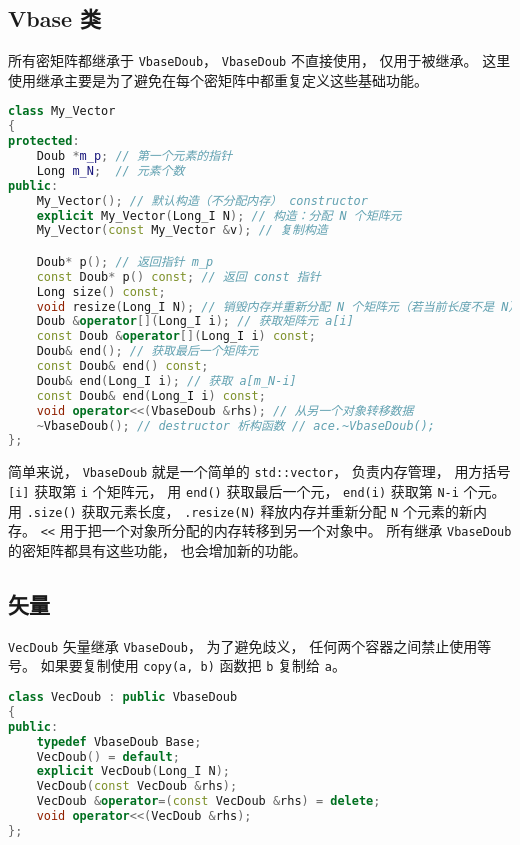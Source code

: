 \subsection{Vbase 类}
所有密矩阵都继承于 \verb|VbaseDoub|， \verb|VbaseDoub| 不直接使用， 仅用于被继承。 这里使用继承主要是为了避免在每个密矩阵中都重复定义这些基础功能。
\begin{lstlisting}[language=cpp]
class My_Vector
{
protected:
    Doub *m_p; // 第一个元素的指针
    Long m_N;  // 元素个数
public:
    My_Vector(); // 默认构造（不分配内存） constructor
    explicit My_Vector(Long_I N); // 构造：分配 N 个矩阵元
    My_Vector(const My_Vector &v); // 复制构造

    Doub* p(); // 返回指针 m_p
    const Doub* p() const; // 返回 const 指针
    Long size() const;
    void resize(Long_I N); // 销毁内存并重新分配 N 个矩阵元（若当前长度不是 N）
    Doub &operator[](Long_I i); // 获取矩阵元 a[i]
    const Doub &operator[](Long_I i) const; 
    Doub& end(); // 获取最后一个矩阵元
    const Doub& end() const;
    Doub& end(Long_I i); // 获取 a[m_N-i]
    const Doub& end(Long_I i) const;
    void operator<<(VbaseDoub &rhs); // 从另一个对象转移数据
    ~VbaseDoub(); // destructor 析构函数 // ace.~VbaseDoub();
};
\end{lstlisting}

简单来说， \verb|VbaseDoub| 就是一个简单的 \verb|std::vector|， 负责内存管理， 用方括号 \verb|[i]| 获取第 \verb|i| 个矩阵元， 用 \verb|end()| 获取最后一个元， \verb|end(i)| 获取第 \verb|N-i| 个元。 用 \verb|.size()| 获取元素长度， \verb|.resize(N)| 释放内存并重新分配 \verb|N| 个元素的新内存。 \verb|<<| 用于把一个对象所分配的内存转移到另一个对象中。 所有继承 \verb|VbaseDoub| 的密矩阵都具有这些功能， 也会增加新的功能。

\subsection{矢量}
\verb|VecDoub| 矢量继承 \verb|VbaseDoub|， 为了避免歧义， 任何两个容器之间禁止使用等号。 如果要复制使用 \verb|copy(a, b)| 函数把 \verb|b| 复制给 \verb|a|。
\begin{lstlisting}[language=cpp]
class VecDoub : public VbaseDoub
{
public:
    typedef VbaseDoub Base;
    VecDoub() = default;
    explicit VecDoub(Long_I N);
    VecDoub(const VecDoub &rhs);
    VecDoub &operator=(const VecDoub &rhs) = delete;
    void operator<<(VecDoub &rhs);
};
\end{lstlisting}

